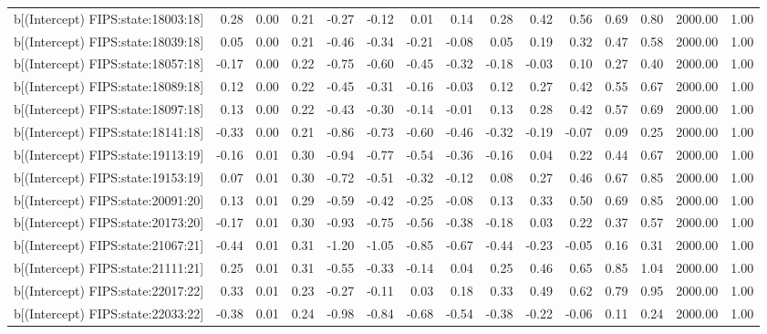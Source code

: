 \begin{table}[ht]
\begin{tabular}{rrrrrrrrrrrrrrr}
  b[(Intercept) FIPS:state:18003:18] & 0.28 & 0.00 & 0.21 & -0.27 & -0.12 & 0.01 & 0.14 & 0.28 & 0.42 & 0.56 & 0.69 & 0.80 & 2000.00 & 1.00 \\ 
  b[(Intercept) FIPS:state:18039:18] & 0.05 & 0.00 & 0.21 & -0.46 & -0.34 & -0.21 & -0.08 & 0.05 & 0.19 & 0.32 & 0.47 & 0.58 & 2000.00 & 1.00 \\ 
  b[(Intercept) FIPS:state:18057:18] & -0.17 & 0.00 & 0.22 & -0.75 & -0.60 & -0.45 & -0.32 & -0.18 & -0.03 & 0.10 & 0.27 & 0.40 & 2000.00 & 1.00 \\ 
  b[(Intercept) FIPS:state:18089:18] & 0.12 & 0.00 & 0.22 & -0.45 & -0.31 & -0.16 & -0.03 & 0.12 & 0.27 & 0.42 & 0.55 & 0.67 & 2000.00 & 1.00 \\ 
  b[(Intercept) FIPS:state:18097:18] & 0.13 & 0.00 & 0.22 & -0.43 & -0.30 & -0.14 & -0.01 & 0.13 & 0.28 & 0.42 & 0.57 & 0.69 & 2000.00 & 1.00 \\ 
  b[(Intercept) FIPS:state:18141:18] & -0.33 & 0.00 & 0.21 & -0.86 & -0.73 & -0.60 & -0.46 & -0.32 & -0.19 & -0.07 & 0.09 & 0.25 & 2000.00 & 1.00 \\ 
  b[(Intercept) FIPS:state:19113:19] & -0.16 & 0.01 & 0.30 & -0.94 & -0.77 & -0.54 & -0.36 & -0.16 & 0.04 & 0.22 & 0.44 & 0.67 & 2000.00 & 1.00 \\ 
  b[(Intercept) FIPS:state:19153:19] & 0.07 & 0.01 & 0.30 & -0.72 & -0.51 & -0.32 & -0.12 & 0.08 & 0.27 & 0.46 & 0.67 & 0.85 & 2000.00 & 1.00 \\ 
  b[(Intercept) FIPS:state:20091:20] & 0.13 & 0.01 & 0.29 & -0.59 & -0.42 & -0.25 & -0.08 & 0.13 & 0.33 & 0.50 & 0.69 & 0.85 & 2000.00 & 1.00 \\ 
  b[(Intercept) FIPS:state:20173:20] & -0.17 & 0.01 & 0.30 & -0.93 & -0.75 & -0.56 & -0.38 & -0.18 & 0.03 & 0.22 & 0.37 & 0.57 & 2000.00 & 1.00 \\ 
  b[(Intercept) FIPS:state:21067:21] & -0.44 & 0.01 & 0.31 & -1.20 & -1.05 & -0.85 & -0.67 & -0.44 & -0.23 & -0.05 & 0.16 & 0.31 & 2000.00 & 1.00 \\ 
  b[(Intercept) FIPS:state:21111:21] & 0.25 & 0.01 & 0.31 & -0.55 & -0.33 & -0.14 & 0.04 & 0.25 & 0.46 & 0.65 & 0.85 & 1.04 & 2000.00 & 1.00 \\ 
  b[(Intercept) FIPS:state:22017:22] & 0.33 & 0.01 & 0.23 & -0.27 & -0.11 & 0.03 & 0.18 & 0.33 & 0.49 & 0.62 & 0.79 & 0.95 & 2000.00 & 1.00 \\ 
  b[(Intercept) FIPS:state:22033:22] & -0.38 & 0.01 & 0.24 & -0.98 & -0.84 & -0.68 & -0.54 & -0.38 & -0.22 & -0.06 & 0.11 & 0.24 & 2000.00 & 1.00 \\ 

\end{tabular}
\end{table}

